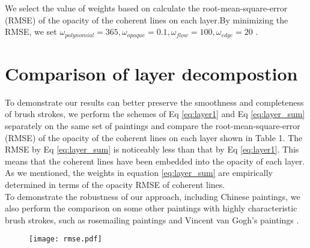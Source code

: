We select the value of weights based on calculate the root-mean-square-error (RMSE) of the opacity of the coherent lines on each layer.By minimizing the RMSE, we set $\omega_{polynomial}=365, \omega_{opaque}=0.1,\omega_{flow}=100, \omega_{edge}=20 $ . 
\section{Comparison of layer decompostion} \label{comparelayer}
To demonstrate our results can better preserve the smoothness and completeness of brush strokes, we perform the schemes of Eq \ref{eq:layer1} and Eq \ref{eq:layer_sum} separately on the same set of  paintings and compare the root-mean-square-error (RMSE) of the opacity of the coherent lines on each layer shown in Table 1. The RMSE by Eq \ref{eq:layer_sum} is noticeably less than that by Eq \ref{eq:layer1}. This means that the coherent lines have been embedded into the opacity of each layer. As we mentioned, the weights in equation \ref{eq:layer_sum} are empirically determined in terms of the opacity RMSE of coherent lines. \\
To demonstrate the robustness of our approach, including Chinese paintings, we also perform the comparison on some other paintings with highly characteristic brush strokes, such as rosemailing paintings\cite{ellingsgard1978rosemaling} and Vincent van Gogh's paintings\cite{li2012rhythmic} . 

\begin{figure}
	\centering
	\texttt{[image: rmse.pdf]}
	\label{table1}

\end{figure}

















